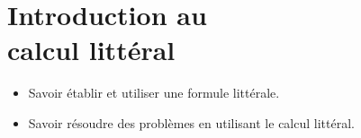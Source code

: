 \chapter{Introduction au\\calcul littéral}\label{ChCalculLitteral}

\vspace{5cm}
\begin{acquis}
\begin{itemize}
\item Savoir établir et utiliser une formule littérale.
\item Savoir résoudre des problèmes en utilisant le calcul littéral.
\end{itemize}
\end{acquis}


\activites  


\cours


\exercicesbase
\begin{colonne*exercice}

\end{colonne*exercice}


%

%

%

%


